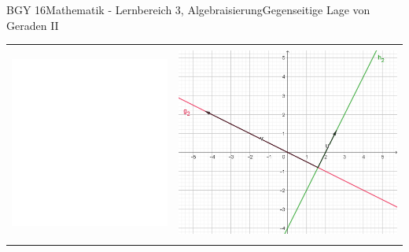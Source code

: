 \documentclass[oneside,openany,headings=optiontotoc,11pt,numbers=noenddot]{scrreprt}
\begin{document}
\begin{worksheet}{BGY 16}{Mathematik - Lernbereich 3, Algebraisierung}{Gegenseitige Lage von Geraden II}
\begin{framed}
\begin{center}
\begin{tabularx}{\textwidth}{Xr}
					\hline\\
					\includegraphics[scale=0.29]{../empty.jpg} & \includegraphics[scale=0.29]{Bilder/ghOrthogonal.jpg}\\
					\hline\\

\end{tabularx}
\end{center}
\end{framed}
\end{worksheet}
\end{document}
